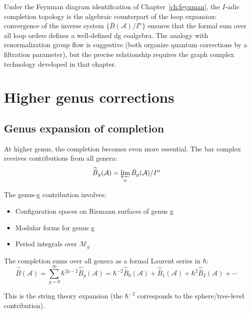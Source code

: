 \begin{remark}
Under the Feynman diagram identification of Chapter~\ref{ch:feynman}, the $I$-adic completion topology is the algebraic counterpart of the loop expansion: convergence of the inverse system $\{\bar{B}(\mathcal{A})/I^n\}$ ensures that the formal sum over all loop orders defines a well-defined dg coalgebra.  The analogy with renormalization group flow is suggestive (both organize quantum corrections by a filtration parameter), but the precise relationship requires the graph complex technology developed in that chapter.
\end{remark}

\section{Higher genus corrections}

\subsection{Genus expansion of completion}

\begin{remark}\label{rem:genus-completion}
At higher genus, the completion becomes even more essential. The bar complex receives contributions from all genera:
\[\widehat{\bar{B}}_g(\mathcal{A}) = \varprojlim_n \bar{B}_g(\mathcal{A})/I^n\]

The genus-g contribution involves:
\begin{itemize}
\item Configuration spaces on Riemann surfaces of genus g
\item Modular forms for genus g
\item Period integrals over $\mathcal{M}_g$
\end{itemize}

The completion sums over all genera as a formal Laurent series in $\hbar$:
\[\widehat{\bar{B}}(\mathcal{A}) = \sum_{g=0}^{\infty} \hbar^{2g-2} \widehat{\bar{B}}_g(\mathcal{A}) = \hbar^{-2}\widehat{\bar{B}}_0(\mathcal{A}) + \widehat{\bar{B}}_1(\mathcal{A}) + \hbar^2 \widehat{\bar{B}}_2(\mathcal{A}) + \cdots\]

This is the string theory expansion (the $\hbar^{-2}$ corresponds to the sphere/tree-level contribution).
\end{remark}


